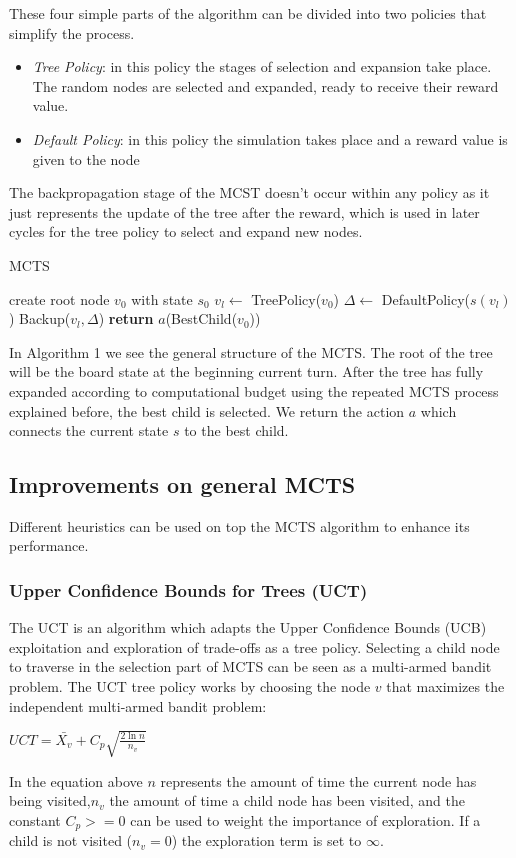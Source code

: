 \documentclass{ba-kecs}
\begin{document}
These four simple parts of the algorithm can be divided into two policies that simplify the process.
\begin{itemize}
\item \textit{Tree Policy}: in this policy the stages of selection and expansion take place. The random nodes are selected and expanded, ready to receive their reward value.
\item \textit{Default Policy}: in this policy the simulation takes place and a reward value is given to the node 
\end{itemize}
The backpropagation stage of the MCST doesn't occur within any policy as it just represents the update of the tree after the reward, which is used in later cycles for the tree policy to select and expand new nodes.

\begin{algorithm}
    \caption{MCTS}
    \label{MCTS}
    \begin{algorithmic}
            \State create root node $v_0$ with state $s_0$
                \State $v_l \gets$ TreePolicy($v_0$)
                \State $ \Delta \gets$ DefaultPolicy($s(v_l)$)
                \State Backup($v_l, \Delta$)
            \EndWhile\label{}
            \State \textbf{return} $a$(BestChild($v_0$))
        \EndProcedure
    \end{algorithmic}
\end{algorithm}

In Algorithm 1 we see the general structure of the MCTS. The root of the tree will be the board state at the beginning current turn. After the tree has fully expanded according to computational budget using the repeated MCTS process explained before, the best child is selected. We return the action $a$ which connects the current state $s$ to the best child.
\subsection{Improvements on general MCTS}
Different heuristics can be used on top the MCTS algorithm to enhance its performance.
\subsubsection{Upper Confidence Bounds for Trees (UCT)}
The UCT is an algorithm which adapts the Upper Confidence Bounds (UCB) exploitation and exploration of trade-offs as a tree policy. 
Selecting a child node to traverse in the selection part of MCTS can be seen as a multi-armed bandit problem.
The UCT tree policy works by choosing the node $v$ that maximizes the independent multi-armed bandit problem:
\begin{center}
$UCT = \bar{X_v} + C_p \sqrt{\frac{2\ln n}{n_v}}$
\end{center}
In the equation above $n$ represents the amount of time the current node has being visited,$n_v$ the amount of time a  child node has been visited, and the constant $C_p >=0 $ can be used to weight the importance of exploration. If a child is not visited ($n_v = 0$) the exploration term is set to $\infty$.
\end{document}
